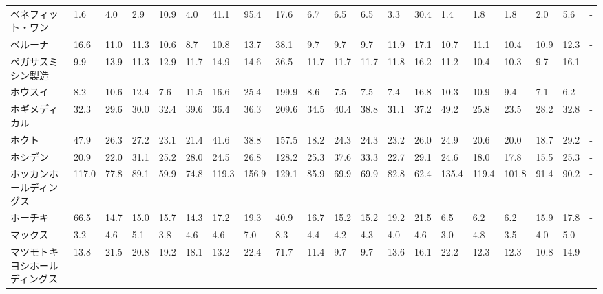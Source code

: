 \begin{tabular}{llllllllllllllllllll}
ベネフィット・ワン       &    1.6 &    4.0 &       2.9 &      10.9 &        4.0 &    41.1 &    95.4 &     17.6 &     6.7 &     6.5 &    6.5 &    3.3 &    30.4 &     1.4 &     1.8 &    1.8 &    2.0 &     5.6 &      - \\
ベルーナ            &   16.6 &   11.0 &      11.3 &      10.6 &        8.7 &    10.8 &    13.7 &     38.1 &     9.7 &     9.7 &    9.7 &   11.9 &    17.1 &    10.7 &    11.1 &   10.4 &   10.9 &    12.3 &      - \\
ペガサスミシン製造       &    9.9 &   13.9 &      11.3 &      12.9 &       11.7 &    14.9 &    14.6 &     36.5 &    11.7 &    11.7 &   11.7 &   11.8 &    16.2 &    11.2 &    10.4 &   10.3 &    9.7 &    16.1 &      - \\
ホウスイ            &    8.2 &   10.6 &      12.4 &       7.6 &       11.5 &    16.6 &    25.4 &    199.9 &     8.6 &     7.5 &    7.5 &    7.4 &    16.8 &    10.3 &    10.9 &    9.4 &    7.1 &     6.2 &      - \\
ホギメディカル         &   32.3 &   29.6 &      30.0 &      32.4 &       39.6 &    36.4 &    36.3 &    209.6 &    34.5 &    40.4 &   38.8 &   31.1 &    37.2 &    49.2 &    25.8 &   23.5 &   28.2 &    32.8 &      - \\
ホクト             &   47.9 &   26.3 &      27.2 &      23.1 &       21.4 &    41.6 &    38.8 &    157.5 &    18.2 &    24.3 &   24.3 &   23.2 &    26.0 &    24.9 &    20.6 &   20.0 &   18.7 &    29.2 &      - \\
ホシデン            &   20.9 &   22.0 &      31.1 &      25.2 &       28.0 &    24.5 &    26.8 &    128.2 &    25.3 &    37.6 &   33.3 &   22.7 &    29.1 &    24.6 &    18.0 &   17.8 &   15.5 &    25.3 &      - \\
ホッカンホールディングス    &  117.0 &   77.8 &      89.1 &      59.9 &       74.8 &   119.3 &   156.9 &    129.1 &    85.9 &    69.9 &   69.9 &   82.8 &    62.4 &   135.4 &   119.4 &  101.8 &   91.4 &    90.2 &      - \\
ホーチキ            &   66.5 &   14.7 &      15.0 &      15.7 &       14.3 &    17.2 &    19.3 &     40.9 &    16.7 &    15.2 &   15.2 &   19.2 &    21.5 &     6.5 &     6.2 &    6.2 &   15.9 &    17.8 &      - \\
マックス            &    3.2 &    4.6 &       5.1 &       3.8 &        4.6 &     4.6 &     7.0 &      8.3 &     4.4 &     4.2 &    4.3 &    4.0 &     4.6 &     3.0 &     4.8 &    3.5 &    4.0 &     5.0 &      - \\
マツモトキヨシホールディングス &   13.8 &   21.5 &      20.8 &      19.2 &       18.1 &    13.2 &    22.4 &     71.7 &    11.4 &     9.7 &    9.7 &   13.6 &    16.1 &    22.2 &    12.3 &   12.3 &   10.8 &    14.9 &      - \\

\end{tabular}
